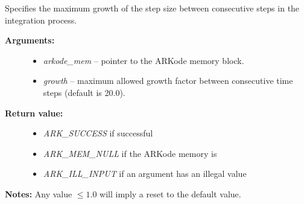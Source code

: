 \documentclass[letterpaper,10pt,english]{sphinxmanual}
\begin{document}
\begin{fulllineitems}
\label{c_interface/User_callable:c.ARKodeSetMaxGrowth}
Specifies the maximum growth of the step size between consecutive
steps in the integration process.
\begin{description}
\item[{\textbf{Arguments:}}] \leavevmode\begin{itemize}
\item {} 
\emph{arkode\_mem} -- pointer to the ARKode memory block.

\item {} 
\emph{growth} -- maximum allowed growth factor between consecutive time steps (default is 20.0).

\end{itemize}

\item[{\textbf{Return value:}}] \leavevmode\begin{itemize}
\item {} 
\emph{ARK\_SUCCESS} if successful

\item {} 
\emph{ARK\_MEM\_NULL} if the ARKode memory is 

\item {} 
\emph{ARK\_ILL\_INPUT} if an argument has an illegal value

\end{itemize}

\end{description}

\textbf{Notes:} Any value \(\le 1.0\) will imply a reset to the default
value.

\end{fulllineitems}

\end{document}

